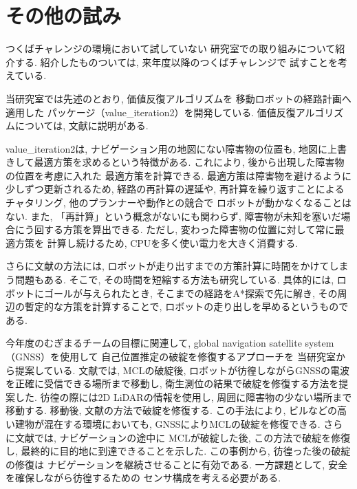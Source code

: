 \documentclass[twocolumn,9pt]{jsproceedings}
\begin{document}
\section{その他の試み}

つくばチャレンジの環境において試していない
研究室での取り組みについて紹介する. 
紹介したものついては, 来年度以降のつくばチャレンジで
試すことを考えている. 

当研究室では先述のとおり, 価値反復アルゴリズムを
移動ロボットの経路計画へ適用した
パッケージ（value\_iteration2\cite{value_iteration2}）を開発している\cite{ueda2023JRM}. 
価値反復アルゴリズムについては, 
文献\cite{上田詳解}に説明がある. 

value\_iteration2は, 
ナビゲーション用の地図にない障害物の位置も, 
地図に上書きして最適方策を求めるという特徴がある. 
これにより, 後から出現した障害物の位置を考慮に入れた
最適方策を計算できる. 
最適方策は障害物を避けるように少しずつ更新されるため, 
経路の再計算の遅延や, 再計算を繰り返すことによるチャタリング, 
他のプランナーや動作との競合で
ロボットが動かなくなることはない. 
また, 「再計算」という概念がないにも関わらず, 
障害物が未知を塞いだ場合にう回する方策を算出できる. 
ただし, 変わった障害物の位置に対して常に最適方策を
計算し続けるため, CPUを多く使い電力を大きく消費する. 

さらに文献\cite{ueda2023JRM}の方法には, 
ロボットが走り出すまでの方策計算に時間をかけてしまう問題もある. 
そこで, その時間を短縮する方法も研究している\cite{中村2024}. 
具体的には, ロボットにゴールが与えられたとき, 
そこまでの経路をA*探索で先に解き, 
その周辺の暫定的な方策を計算することで, 
ロボットの走り出しを早めるというものである. 

今年度のむぎまるチームの目標に関連して, 
global navigation satellite system（GNSS）を使用して
自己位置推定の破綻を修復するアプローチを
当研究室から提案している\cite{吉越2024}\cite{吉越2025}. 
文献\cite{吉越2024}では, MCLの破綻後, 
ロボットが彷徨しながらGNSSの電波を正確に受信できる場所まで移動し, 
衛生測位の結果で破綻を修復する方法を提案した. 
彷徨の際には2D LiDARの情報を使用し, 
周囲に障害物の少ない場所まで移動する. 
移動後, 文献\cite{goto2018}の方法で破綻を修復する. 
この手法により, 
ビルなどの高い建物が混在する環境においても, 
GNSSによりMCLの破綻を修復できる. 
さらに文献\cite{吉越2025}では, ナビゲーションの途中に
MCLが破綻した後, この方法で破綻を修復し, 
最終的に目的地に到達できることを示した. 
この事例から, 彷徨った後の破綻の修復は
ナビゲーションを継続させることに有効である. 
一方課題として, 安全を確保しながら彷徨するための
センサ構成を考える必要がある. 
\end{document}
